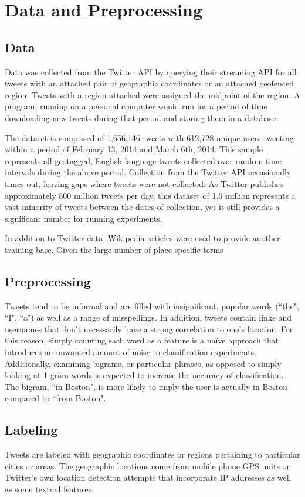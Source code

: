 \documentclass[midd]{thesis}
\begin{document}
\chapter{Data and Preprocessing}
\section{Data}

Data was collected from the Twitter API by querying their streaming API for all tweets with an attached pair of geographic coordinates or an attached geofenced region. Tweets with a region attached were assigned the midpoint of the region. A program, running on a personal computer would run for a period of time downloading new tweets during that period and storing them in a database. 

The dataset is comprised of 1,656,146 tweets with 612,728 unique users tweeting within a period of February 13, 2014 and March 6th, 2014. This sample represents all geotagged, English-language tweets collected over random time intervals during the above period. Collection from the Twitter API occasionally times out, leaving gaps where tweets were not collected. As Twitter publishes approximately 500 million tweets per day, this dataset of 1.6 million represents a vast minority of tweets between the dates of collection, yet it still provides a significant number for running experiments.

In addition to Twitter data, Wikipedia articles were used to provide another training base. Given the large number of place specific terms 
\section{Preprocessing}
Tweets tend to be informal and are filled with insignificant, popular words (``the", ``I", ``a") as well as a range of misspellings. In addition, tweets contain links and usernames that don't necessarily have a strong correlation to one's location. For this reason, simply counting each word as a feature is a naïve approach that introduces an unwanted amount of noise to classification experiments. Additionally, examining bigrams, or particular phrases, as opposed to simply looking at 1-gram words is expected to increase the accuracy of classification. The bigram, ``in Boston", is more likely to imply the user is actually in Boston compared to ``from Boston".

\section{Labeling}
Tweets are labeled with geographic coordinates or regions pertaining to particular cities or areas. The geographic locations come from mobile phone GPS units or Twitter's own location detection attempts that incorporate IP addresses as well as some textual features.
\end{document}
